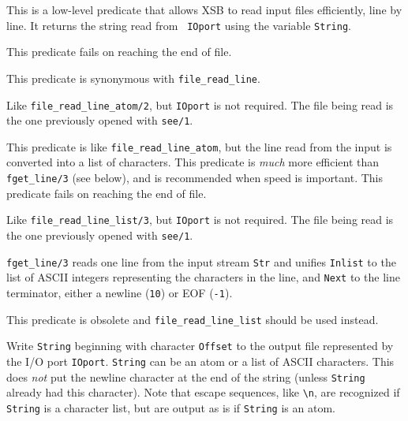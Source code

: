 \begin{description}
    This is a low-level predicate that allows XSB to read input files
    efficiently, line by line. It returns the string read from {\tt
      IOport} using the variable {\tt String}.

    This predicate fails on reaching the end of file.
    
    This predicate is synonymous with \verb|file_read_line|.
    
   Like \verb|file_read_line_atom/2|, but {\tt IOport} is not required.
   The file being read is the one previously opened with {\tt see/1}.

    This predicate is like \verb|file_read_line_atom|, but the line read from
    the input is converted into a list of characters.
    This predicate is \emph{much} more efficient than {{\tt fget\_line/3}}
    (see below), and is recommended when speed is important.
    This predicate fails on reaching the end of file.

   Like \verb|file_read_line_list/3|, but {\tt IOport} is not required.
   The file being read is the one previously opened with {\tt see/1}.

    {\tt fget\_line/3} reads one line from the input stream {\tt Str} and
    unifies {\tt Inlist} to the list of ASCII integers representing the
    characters in the line, and {\tt Next} to the line terminator, either
    a newline ({\tt 10}) or EOF ({\tt-1}).
    
    This predicate is obsolete and
    \verb|file_read_line_list| should be used instead.

   Write {\tt String} beginning with character {\tt Offset}  to the output
   file represented by the I/O port {\tt IOport}. {\tt String} can
   be an atom or a list of ASCII characters. This does \emph{not} put the
   newline character at the end of the string (unless {\tt String} already
   had this character). Note that escape sequences, like \verb|\n|, are
   recognized if {\tt String} is a character list, but are output as is if
   {\tt String} is an atom.
   

\end{description}
